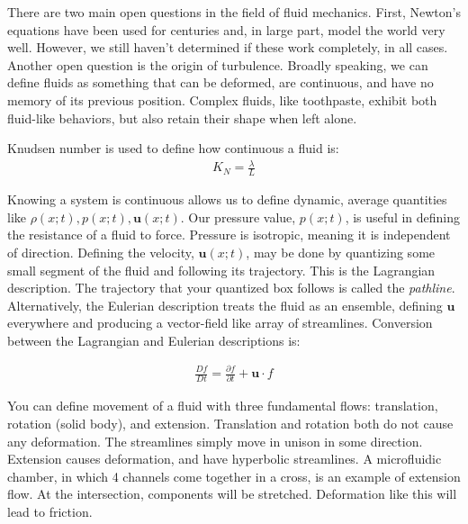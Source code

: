 There are two main open questions in the field of fluid mechanics. First, Newton's equations have been used for centuries and, in large part, model the world very well. However, we still haven't determined if these work completely, in all cases. Another open question is the origin of turbulence. Broadly speaking, we can define fluids as something that can be deformed, are continuous, and have no memory of its previous position. Complex fluids, like toothpaste, exhibit both fluid-like behaviors, but also retain their shape when left alone. \newline

Knudsen number is used to define how continuous a fluid is: 
\begin{equation} \label{knum}
\begin{split}
K_N = \frac{\lambda}{L}
\end{split}
\end{equation}

Knowing a system is continuous allows us to define dynamic, average quantities like $\rho(x;t), p(x;t), \mathbf{u}(x;t)$. Our pressure value, $p(x;t)$, is useful in defining the resistance of a fluid to force. Pressure is isotropic, meaning it is independent of direction. Defining the velocity, $\mathbf{u}(x;t)$, may be done by quantizing some small segment of the fluid and following its trajectory. This is the Lagrangian description. The trajectory that your quantized box follows is called the \textit{pathline}. Alternatively, the Eulerian description treats the fluid as an ensemble, defining $\mathbf{u}$ everywhere and producing a vector-field like array of streamlines. Conversion between the Lagrangian and Eulerian descriptions is:\newline

\begin{equation} \label{LtoE}
\begin{split}
\frac{Df}{Dt} = \frac{\partial f}{\partial t} + \mathbf{u}\cdot f
\end{split}
\end{equation}

You can define movement of a fluid with three fundamental flows: translation, rotation (solid body), and extension. Translation and rotation both do not cause any deformation. The streamlines simply move in unison in some direction. Extension causes deformation, and have hyperbolic streamlines. A microfluidic chamber, in which 4 channels come together in a cross, is an example of extension flow. At the intersection, components will be stretched. Deformation like this will lead to friction.\newline

